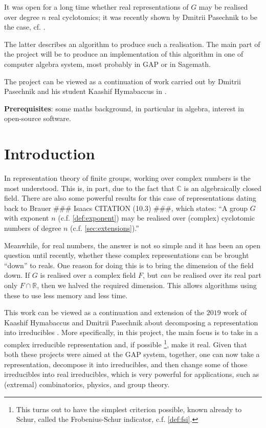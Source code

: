\documentclass[11pt]{article}
\begin{document}
It was open for a long time whether real representations of $G$ may be realised
over degree $n$ real cyclotomics; it was recently shown by Dmitrii Pasechnik to be
the case, cf. \cite{Pas21}.

The latter describes an algorithm to produce such a realisation. The main part of the
project will be to produce an implementation of this algorithm in one of computer
algebra system, most probably in GAP or in Sagemath.

The project can be viewed as a continuation of work carried out by Dmitrii Pasechnik
and his student Kaashif Hymabaccus in \cite{Hymabaccus2020}.

\textbf{Prerequisites}: some maths background, in particular in algebra, interest in open-source software.

\newpage

\tableofcontents

\newpage

\section{Introduction}

In representation theory of finite groups, working over complex numbers is the
most understood. This is, in part, due to the fact that $\mathbb{C}$ is an
algebraically closed field. There are also some powerful results for this case of
representations dating back to Brauer \#\#\# Isaacs CITATION (10.3) \#\#\#, which
states: ``A group $G$ with exponent $n$ (c.f. \cref{def:exponent}) may be
realised over (complex) cyclotomic numbers of degree $n$
(c.f. \cref{sec:extensions}).''

Meanwhile, for real numbers, the answer is not so simple and it has been an open
question until recently, whether these complex representations can be brought
``down'' to reals. One reason for doing this is to bring the dimension of the
field down. If $G$ is realised over a complex field $F$, but \textit{can} be
realised over its real part only $F \cap \mathbb{R}$, then we halved the required
dimension. This allows algorithms using these to use less memory and less time.

This work can be viewed as a continuation and extension of the $2019$ work of
Kaashif Hymabaccus and Dmitrii Pasechnik about decomposing a representation into
irreducibles \cite{Hymabaccus2020}. More specifically, in this project, the main
focus is to take in a complex irreducible representation and, if possible
\footnote{This turns out to have the simplest criterion possible, known already
to Schur, called the Frobenius-Schur indicator, c.f. \cref{def:fsi}.},
make it real. Given that both these projects were aimed at the GAP system,
together, one can now take a representation, decompose it into irreducibles, and
then change some of those irreducibles into real irreducibles, which is very
powerful for applications, such as (extremal) combinatorics, physics, and
group theory.
\end{document}
